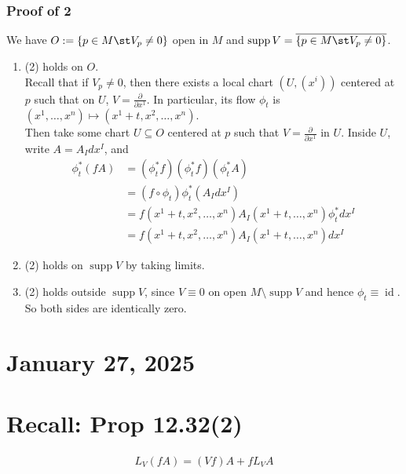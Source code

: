 \documentclass[11pt]{article}
\begin{document}
\subsubsection*{Proof of 2}
\label{sec:orga22c7d9}
We have \(O:=\{p\in M\st V_{p}\neq0\}\) open in \(M\) and \(\operatorname{supp}V=\overline{\{p\in M\st V_{p}\neq0\}}\).\\
\begin{enumerate}
\item (2) holds on \(O\).\\

Recall that if \(V_{p}\neq0\), then there exists a local chart \((U,(x^{i}))\) centered at \(p\) such that on \(U\), \(V=\frac{\partial}{\partial x^{1}}\). In particular, its flow \(\phi_{t}\) is \((x^{1},\ldots,x^{n})\mapsto(x^{1}+t,x^{2},\ldots,x^{n})\).\\
Then take some chart \(U\subseteq O\) centered at \(p\) such that \(V=\frac{\partial}{\partial x^{1}}\) in \(U\). Inside \(U\), write \(A=A_{I}dx^{I}\), and\\
\begin{align*}
  \phi^{*}_{t}(fA)
  &=(\phi_{t}^{*}f)(\phi_{t}^{*}f)(\phi_{t}^{*}A) \\
  &=(f\circ\phi_{t})\phi_{t}^{*}(A_{I}dx^{I}) \\
  &=f(x^{1}+t,x^{2},\ldots,x^{n})A_{I}(x^{1}+t,\ldots,x^{n})\phi_{t}^{*}dx^{I} \\
  &=f(x^{1}+t,x^{2},\ldots,x^{n})A_{I}(x^{1}+t,\ldots,x^{n})dx^{I}
\end{align*}
\item (2) holds on \(\operatorname{supp}V\) by taking limits.\\
\item (2) holds outside \(\operatorname{supp}V\), since \(V\equiv0\) on open \(M\setminus\operatorname{supp}V\) and hence \(\phi_{t}\equiv \operatorname{id}\). So both sides are identically zero.\\
\end{enumerate}
\section*{January 27, 2025}
\label{sec:org69c3a7f}
\section*{Recall: Prop 12.32(2)}
\label{sec:org8d4e588}
\begin{align*}
  L_{V}(fA)
  =(Vf)A+fL_{V}A
\end{align*}
\end{document}
